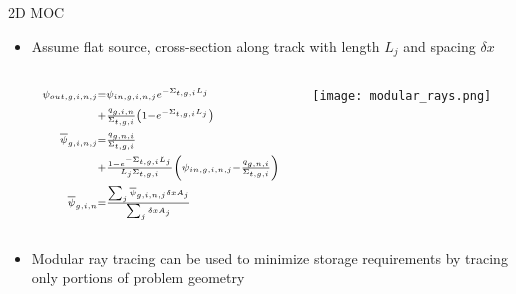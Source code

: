 \begin{frame}[t]{2D MOC}

    \begin{itemize}
      \item Assume flat source, cross-section along track with 
      length $L_j$ and spacing $\delta x$
      \begin{columns}
        \begin{column}{0.6\textwidth}
      \begin{align*}\scriptstyle
      \psi_{out,g,i,n,j} &\scriptstyle = \psi_{in,g,i,n,j}e^{-\Sigma_{t,g,i} 
      L_j} 
      \\\scriptstyle
      &\scriptstyle + \frac{q_{g,i,n}}{\Sigma_{t,g,i}}\left(1 - 
      e^{-\Sigma_{t,g,i}L_j}\right) \\\scriptstyle
      \overline{\psi}_{g,i,n,j} &\scriptstyle = 
      \frac{q_{g,n,i}}{\Sigma_{t,g,i}} 
      \\\scriptstyle
      &\scriptstyle + \frac{1 - e^{-\Sigma_{t,g,i} 
          L_j}}{L_j\Sigma_{t,g,i}}\left(\psi_{in,g,i,n,j} - 
      \frac{q_{g,n,i}}{\Sigma_{t,g,i}}\right) \\\scriptstyle
      \overline{\psi}_{g,i,n} &\scriptstyle = \frac{\sum_j 
      \overline{\psi}_{g,i,n,j} \delta x A_j}{\sum_j \delta x A_j}
      \end{align*}
    \end{column}
  \begin{column}{0.4\textwidth}
  \texttt{[image: modular\_rays.png]}
\end{column}
\end{columns}
      \item Modular ray tracing can be used to minimize storage requirements by 
      tracing only portions of problem geometry
    \end{itemize}

\end{frame} 


